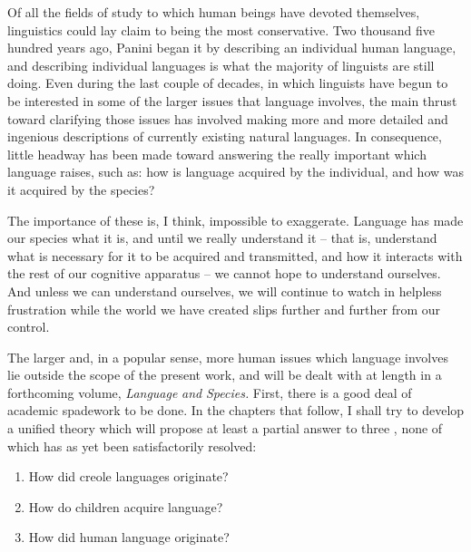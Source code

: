 
Of all the fields of study to which human beings have devoted themselves, linguistics could lay claim to being the most conservative. Two thousand five hundred years ago, Panini began it by describing an individual human language, and describing individual languages is what the majority of linguists are still doing. Even during the last couple of decades, in which linguists have begun to be interested in some of the larger issues that language involves, the main thrust toward clarifying those issues has involved making more and more detailed and ingenious descriptions of currently existing natural languages. In consequence, little headway has been made toward answering the really important  which language raises, such as: how is language acquired by the individual, and how was it acquired by the species?

The importance of these  is, I think, impossible to exaggerate. Language has made our species what it is, and until we really understand it -- that is, understand what is necessary for it to be acquired and transmitted, and how it interacts with the rest of our cognitive apparatus -- we cannot hope to understand ourselves. And unless we can understand ourselves, we will continue to watch in helpless frustration while the world we have created slips further and further from our control.

The larger and, in a popular sense, more human issues which language involves lie outside the scope of the present work, and will be dealt with at length in a forthcoming volume, \textit{Language} \textit{and} \textit{Species.} First, there is a good deal of academic spadework to be done. In the chapters that follow, I shall try to develop a unified theory which will propose at least a partial answer to three , none of which has as yet been satisfactorily resolved:

\begin{enumerate}
\item How did creole languages originate?
\item How do children acquire language?
\item How did human language originate?
\end{enumerate} 

